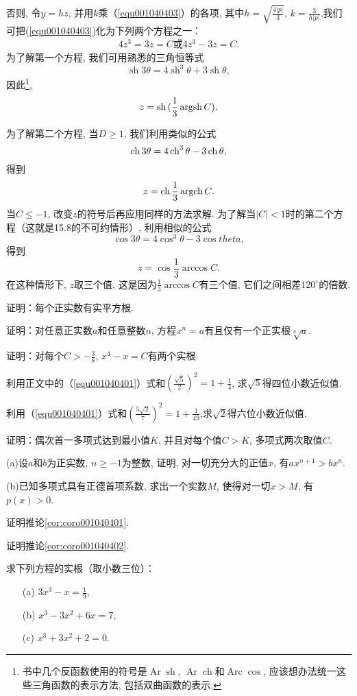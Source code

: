 否则, 令$y=hz$, 并用$k$乘（\ref{equ001040403}）的各项, 其中$h=\sqrt{\frac{4|p|}{3}}$, $k=\frac{3}{h|p|}$,我们可把(\ref{equ001040403})化为下列两个方程之一：
\begin{gather}\label{equ001040408}
4z^3=3z=C\text{或}4z^3-3z=C.
\end{gather}
为了解第一个方程, 我们可用熟悉的三角恒等式
\[
\operatorname{sh}{3\theta} = 4\operatorname{sh}^3{\theta} + 3\operatorname{sh}{\theta},
\]
因此\footnote{书中几个反函数使用的符号是$\operatorname{Ar}\operatorname{sh}$, $\operatorname{Ar}\operatorname{ch}$和$\operatorname{Arc}\operatorname{cos}$, 应该想办法统一这些三角函数的表示方法, 包括双曲函数的表示. },
\[
z = \operatorname{sh}{(\frac{1}{3}\operatorname{argsh}{C})}.
\]

为了解第二个方程, 当$D \ge 1$, 我们利用类似的公式
\[
\operatorname{ch}{3\theta} = 4\operatorname{ch}^3{\theta} -3\operatorname{ch}{\theta},
\]
得到
\[
z = \operatorname{ch}{\frac{1}{3}\operatorname{argch}{C}}.
\]
当$C \le -1$, 改变$z$的符号后再应用同样的方法求解. 为了解当$|C|<1$时的第二个方程（这就是15.8的不可约情形）, 利用相似的公式
\[
\cos{3\theta} = 4\cos^3{\theta}-3\cos{theta},
\]
得到
\[
z = \cos{\frac{1}{3}\arccos{C}}.
\]
在这种情形下, $z$取三个值, 这是因为$\frac{1}{3}\arccos{C}$有三个值, 它们之间相差$120^\circ$的倍数. 

\begin{problemset}
\item 证明：每个正实数有实平方根. 

\item 证明：对任意正实数$a$和任意整数$n$, 方程$x^n=a$有且仅有一个正实根$\sqrt[n]{a}$.

\item 证明：对每个$C > -\frac{3}{8}$, $x^4-x=C$有两个实根. 

\item 利用正文中的（\ref{equ001040401}）式和$(\frac{\sqrt{5}}{2})^2 = 1 + \frac{1}{4}$, 求$\sqrt{5}$得四位小数近似值. 

\item 利用（\ref{equ001040401}）式和$(\frac{5\sqrt{2}}{7})^2 = 1 + \frac{1}{49}$,求$\sqrt{2}$得六位小数近似值. 

\item 证明：偶次首一多项式达到最小值$K$, 并且对每个值$C>K$, 多项式两次取值$C$.

\item (a)设$a$和$b$为正实数, $n \ge -1$为整数, 证明, 对一切充分大的正值$x$, 有$ax^{n+1} > bx^n$.

(b)已知多项式具有正德首项系数, 求出一个实数$M$, 使得对一切$x > M$, 有$p(x)>0$.

\item 证明推论\ref{cor:coro001040401}.

\item 证明推论\ref{cor:coro001040402}.

\item 求下列方程的实根（取小数三位）：
\begin{enumerate}
\item[(a)]$3x^3 - x = \frac{1}{9}$,
\item[(b)]$x^3 - 3x^2 + 6x = 7$,
\item[(c)]$x^3+3x^2+2=0$.
\end{enumerate}
\end{problemset}


